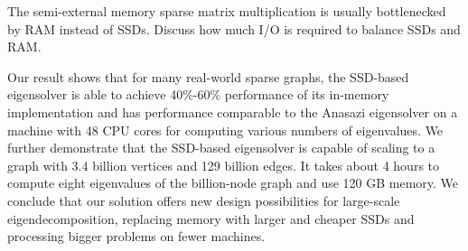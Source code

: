 The semi-external memory sparse matrix multiplication is usually bottlenecked
by RAM instead of SSDs. Discuss how much I/O is required to balance SSDs and
RAM.

Our result shows that for many real-world sparse graphs, the SSD-based
eigensolver is able to achieve 40\%-60\%
performance of its in-memory implementation and has performance comparable to
the Anasazi eigensolver on a machine with 48 CPU cores for computing various
numbers of eigenvalues. We further demonstrate that the SSD-based eigensolver
is capable of scaling to a graph with 3.4 billion vertices and 129 billion edges.
It takes about 4 hours to compute eight eigenvalues of the billion-node graph
and use 120 GB memory. We conclude that our solution offers new design
possibilities for large-scale eigendecomposition, replacing memory with larger
and cheaper SSDs and processing bigger problems on fewer machines.
